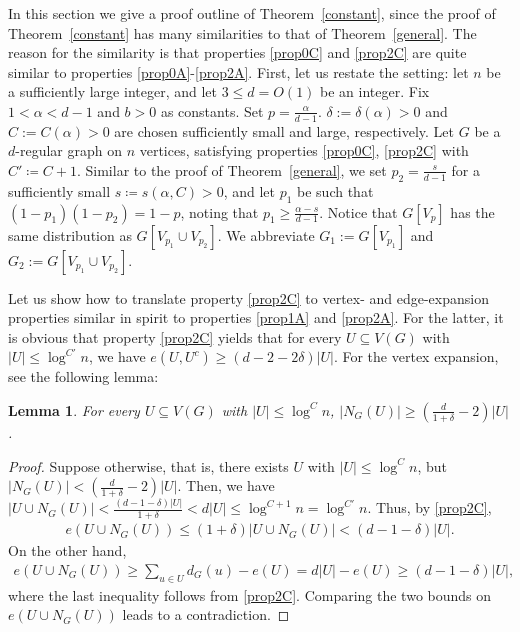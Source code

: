 \documentclass[notitlepage]{scrartcl}
\newtheorem{lemma}[thm]{Lemma}
\begin{document}
In this section we give a proof outline of Theorem~\ref{constant}, since the proof of Theorem~\ref{constant} has many similarities to that of Theorem~\ref{general}. The reason for the similarity is that properties \ref{prop0C} and \ref{prop2C} are quite similar to properties \ref{prop0A}-\ref{prop2A}. First, let us restate the setting: let $n$ be a sufficiently large integer, and let $3\le d=O(1)$ be an integer. Fix $1<\alpha<d-1$ and $b>0$ as constants. Set $p=\frac{\alpha}{d-1}$. $\delta:=\delta(\alpha)>0$ and $C:=C(\alpha)>0$ are chosen sufficiently small and large, respectively. Let $G$ be a $d$-regular graph on $n$ vertices, satisfying properties \ref{prop0C}, \ref{prop2C} with $C'\coloneqq C+1$. Similar to the proof of Theorem~\ref{general}, we set $p_2=\frac{s}{d-1}$ for a sufficiently small $s\coloneqq s(\alpha,C)>0$, and let $p_1$ be such that $(1-p_1)(1-p_2)=1-p$, noting that $p_1\geq \frac{\alpha-s}{d-1}$. Notice that $G[V_p]$ has the same distribution as $G[V_{p_1}\cup V_{p_2}]$. We abbreviate $G_1:=G[V_{p_1}]$ and $G_2:=G[V_{p_1}\cup V_{p_2}]$.

Let us show how to translate property \ref{prop2C} to vertex- and edge-expansion properties similar in spirit to properties \ref{prop1A} and \ref{prop2A}. For the latter, it is obvious that property \ref{prop2C} yields that for every $U\subseteq V(G)$ with $|U|\leq \log^{C'} n$, we have $e(U,U^c)\geq (d-2-2\delta)|U|$. For the vertex expansion, see the following lemma:

\begin{lemma} \label{basic2}
    For every $U\subseteq V(G)$ with $|U|\leq \log^C n$, $|N_G(U)|\ge \left(\frac{d}{1+\delta}-2\right)|U|$.
\end{lemma}

\begin{proof}
    Suppose otherwise, that is, there exists $U$ with $|U|\leq \log^C n$, but $|N_G(U)|< \left(\frac{d}{1+\delta}-2\right)|U|$.
    Then, we have $|U\cup N_G(U)|<\frac{(d-1-\delta)|U|}{1+\delta}<d|U|\le \log^{C+1} n=\log^{C'}n$.
    Thus, by \ref{prop2C},
    \begin{align*}
        e(U\cup N_G(U))\leq (1+\delta)|U\cup N_G(U)|<(d-1-\delta)|U|.
    \end{align*}
    On the other hand,
    \begin{align*}
        e(U\cup N_G(U))\ge \sum_{u\in U}d_G(u)-e(U)= d|U|-e(U)\geq (d-1-\delta)|U|,
    \end{align*}
    where the last inequality follows from \ref{prop2C}.
    Comparing the two bounds on $e(U\cup N_G(U))$ leads to a contradiction.
\end{proof}
\end{document}
